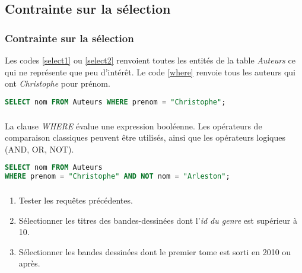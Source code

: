 \documentclass[svgnames,11pt]{beamer}
\begin{document}
\subsection{Contrainte sur la sélection}
\begin{frame}[fragile]
    \frametitle{Contrainte sur la sélection}

    Les codes \ref{select1} ou \ref{select2} renvoient toutes les entités de la table \emph{Auteurs} ce qui ne représente que peu d'intérêt. Le code \ref{where} renvoie tous les auteurs qui ont \emph{Christophe} pour prénom.
    \begin{center}
        \begin{lstlisting}[language=SQL , basicstyle=\ttfamily\small, xleftmargin=1em, xrightmargin=-1em]
SELECT nom FROM Auteurs WHERE prenom = "Christophe";
\end{lstlisting}
        \label{where}
    \end{center}

\end{frame}
\begin{frame}[fragile]
    \frametitle{}

    La clause \emph{WHERE} évalue une expression booléenne. Les opérateurs de comparaison classiques peuvent être utilisés, ainsi que les opérateurs logiques (AND, OR, NOT).
    \begin{center}
        \begin{lstlisting}[language=SQL , basicstyle=\ttfamily\small, xleftmargin=1em, xrightmargin=-1em]
SELECT nom FROM Auteurs 
WHERE prenom = "Christophe" AND NOT nom = "Arleston";
\end{lstlisting}
        \label{where2}
    \end{center}

\end{frame}
\begin{frame}
    \frametitle{}

    \begin{activite}
        \begin{enumerate}
            \item Tester les requêtes précédentes.
            \item Sélectionner les titres des bandes-dessinées dont l'\emph{id du genre} est supérieur à 10.
            \item Sélectionner les bandes dessinées dont le premier tome est sorti en 2010 ou après.
        \end{enumerate}
    \end{activite}

\end{frame}
\end{document}
